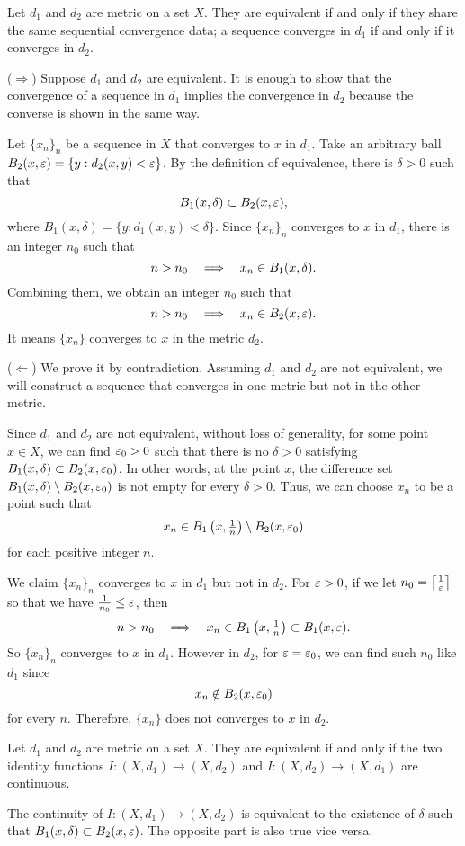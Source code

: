 \documentclass{../crs}
\begin{document}
\begin{prop}\label{prop:sequential convergence data}
Let $d_1$ and $d_2$ are metric on a set $X$.
They are equivalent if and only if they share the same sequential convergence data; a sequence converges in $d_1$ if and only if it converges in $d_2$.
\end{prop}
\begin{pf}
($\Rightarrow$)
Suppose $d_1$ and $d_2$ are equivalent.
It is enough to show that the convergence of a sequence in $d_1$ implies the convergence in $d_2$ because the converse is shown in the same way.

Let $\{x_n\}_n$ be a sequence in $X$ that converges to $x$ in $d_1$.
Take an arbitrary ball $B_2(x,\varepsilon)=\{y:d_2(x,y)<\varepsilon\}$.
By the definition of equivalence, there is $\delta>0$ such that
\[B_1(x,\delta)\subset B_2(x,\varepsilon),\]
where $B_1(x,\delta)=\{y:d_1(x,y)<\delta\}$.
Since $\{x_n\}_n$ converges to $x$ in $d_1$, there is an integer $n_0$ such that
\[n>n_0\impl x_n\in B_1(x,\delta).\]
Combining them, we obtain an integer $n_0$ such that
\[n>n_0\impl x_n\in B_2(x,\e).\]
It means $\{x_n\}$ converges to $x$ in the metric $d_2$.

($\Leftarrow$)
We prove it by contradiction.
Assuming $d_1$ and $d_2$ are not equivalent, we will construct a sequence that converges in one metric but not in the other metric.

Since $d_1$ and $d_2$ are not equivalent, without loss of generality, for some point $x\in X$, we can find $\varepsilon_0>0$ such that there is no $\delta>0$ satisfying $B_1(x,\delta)\subset B_2(x,\varepsilon_0)$.
In other words, at the point $x$, the difference set $B_1(x,\delta)\setminus B_2(x,\varepsilon_0)$ is not empty for every $\delta>0$.
Thus, we can choose $x_n$ to be a point such that
\[x_n\in B_1\left(x,\tfrac1n\right)\setminus B_2(x,\varepsilon_0)\]
for each positive integer $n$.

We claim $\{x_n\}_n$ converges to $x$ in $d_1$ but not in $d_2$.
For $\varepsilon>0$, if we let $n_0=\left\lceil\frac1{\varepsilon}\right\rceil$ so that we have $\frac1{n_0}\le\varepsilon$, then
\[n>n_0\impl x_n\in B_1\left(x,\tfrac1n\right)\subset B_1(x,\e).\]
So $\{x_n\}_n$ converges to $x$ in $d_1$.
However in $d_2$, for $\varepsilon=\varepsilon_0$, we can find such $n_0$ like $d_1$ since
\[x_n\notin B_2(x,\varepsilon_0)\]
for every $n$.
Therefore, $\{x_n\}$ does not converges to $x$ in $d_2$.
\end{pf}
\begin{prop}
Let $d_1$ and $d_2$ are metric on a set $X$.
They are equivalent if and only if the two identity functions $I:(X,d_1)\to(X,d_2)$ and $I:(X,d_2)\to(X,d_1)$ are continuous.
\end{prop}
\begin{pf}
The continuity of $I:(X,d_1)\to(X,d_2)$ is equivalent to the existence of $\delta$ such that $B_1(x,\delta)\subset B_2(x,\varepsilon)$.
The opposite part is also true vice versa.
\end{pf}
\end{document}

